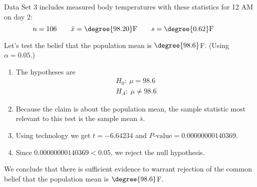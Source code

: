 \documentclass{beamer}
\newcommand{\nullhypothesis}[1]{H_0:~{#1}}
\newcommand{\althypothesis}[1]{H_A:~{#1}}
\begin{document}
\begin{frame}
\begin{example}
Data Set 3  includes measured body temperatures with these statistics for 12 AM on day 2:
\vspace{-1mm}
\begin{equation*}
n=106\qquad
\bar{x}=\degree{98.20}\text{F}\qquad
s=\degree{0.62}\text{F}\qquad
\end{equation*}\pause

\vspace{-5mm}
Let's test the belief that the population mean is $\degree{98.6}$F. (Using $\alpha=0.05$.)\pause
\begin{enumerate}
\item The hypotheses are
\begin{equation*}
\begin{aligned}
\nullhypothesis{\mu=98.6} \\
\althypothesis{\mu\neq98.6}
\end{aligned}
\end{equation*}\pause
\vspace{-3mm}
\item Because the claim is about the population mean, the sample statistic most relevant to this test is the sample mean $\bar{s}$.\pause
\item Using technology we get $t=-6.64234$ and $P\text{-value}=0.00000000140369$.\pause
\item Since $0.00000000140369<0.05$, we reject the null hypothesis.\pause
\end{enumerate}
We conclude that there is sufficient evidence to warrant rejection of the common belief that the population mean is $\degree{98.6}$F.
\end{example}
\end{frame}
\end{document}
